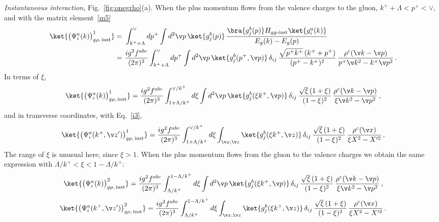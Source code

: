 \emph{Instantaneous interaction}, Fig.~\ref{fig:onegrho}(a). When the plus momentum flows from the valence
charges to the gluon, $k^{+}+\Lambda<p^{+}<\vee$, and with the matrix element~\eqref{m5}
\begin{align}\label{oneginst1}
\ket{\big(\Psi^{a}_{i}(k)\big)^{1}_{g\rho,\,{\rm inst}}}
=\ &\int_{k^{+}+\Lambda}^{\vee}dp^{+}\int d^{2}\v p\,\ket{g^{b}_{j}(p)}\,
\frac{\bra{g^{b}_{j}(p)}H_{gg\text{-inst}}\ket{g^{a}_{i}(k)}}{E_{g}(k)-E_{g}(p)}\notag\\
=\ &\frac{ig^{2}f^{abc}}{(2\pi)^{3}}\int_{k^{+}+\Lambda}^{\vee}dp^{+}\int d^{2}\v p\,\ket{g^{b}_{j}(p^{+},\v p)}\,
\delta_{ij}\,\frac{\sqrt{p^{+}k^{+}}\,(k^{+}+p^{+})}{(p^{+}-k^{+})^{2}}\,
\frac{\rho^{c}(\v k-\v p)}{p^{+}\v k^{2}-k^{+}\v p^{2}}\,.
\end{align}
In terms of $\xi$,
\begin{align}\label{oneginst11}
\ket{\big(\Psi^{a}_{i}(k)\big)^{1}_{g\rho,\,{\rm inst}}}
=\frac{ig^{2}f^{abc}}{(2\pi)^{3}}\int_{1+\Lambda/k^{+}}^{\vee/k^{+}}d\xi\int d^{2}\v p\,
\ket{g^{b}_{j}(\xi k^{+},\v p)}\,\delta_{ij}\,\frac{\sqrt{\xi}\,(1+\xi)}{(1-\xi)^{2}}\,
\frac{\rho^{c}(\v k-\v p)}{\xi\v k^{2}-\v p^{2}}\,,
\end{align}
and in transverse coordinates, with Eq.~\eqref{i3},
\begin{align}\label{Eq:onegluoninstX1}
\ket{\big(\Psi^{a}_{i}(k^{+},\v z')\big)^{1}_{g\rho,\,{\rm inst}}}
=\frac{ig^{2}f^{abc}}{(2\pi)^{3}}\int_{1+\Lambda/k^{+}}^{\vee/k^{+}}d\xi\int_{\v x,\v z}
\ket{g^{b}_{j}(\xi k^{+},\v z)}\,\delta_{ij}\,\frac{\sqrt{\xi}\,(1+\xi)}{(1-\xi)^{2}}\,
\frac{\rho^{c}(\v x)}{\xi X^{2}-X'^{2}}\,.
\end{align}
The range of $\xi$ is unusual here, since $\xi>1$. When the plus momentum flows from the gluon to the
valence charges we obtain the same expression with $\Lambda/k^{+}<\xi<1-\Lambda/k^{+}$:
\begin{align}\label{oneginst2}
\ket{\big(\Psi^{a}_{i}(k)\big)^{2}_{g\rho,\,{\rm inst}}}
=\frac{ig^{2}f^{abc}}{(2\pi)^{3}}\int_{\Lambda/k^{+}}^{1-\Lambda/k^{+}}d\xi\int d^{2}\v p\,
\ket{g^{b}_{j}(\xi k^{+},\v p)}\,\delta_{ij}\,\frac{\sqrt{\xi}\,(1+\xi)}{(1-\xi)^{2}}\,
\frac{\rho^{c}(\v k-\v p)}{\xi\v k^{2}-\v p^{2}}\,,
\end{align}
\begin{align}\label{Eq:onegluoninstX2}
\ket{\big(\Psi^{a}_{i}(k^{+},\v z')\big)^{2}_{g\rho,\,{\rm inst}}}
=\frac{ig^{2}f^{abc}}{(2\pi)^{3}}\int_{\Lambda/k^{+}}^{1-\Lambda/k^{+}}d\xi\int_{\v x,\v z}
\ket{g^{b}_{j}(\xi k^{+},\v z)}\,\delta_{ij}\,\frac{\sqrt{\xi}\,(1+\xi)}{(1-\xi)^{2}}\,
\frac{\rho^{c}(\v x)}{\xi X^{2}-X'^{2}}\,.
\end{align}

